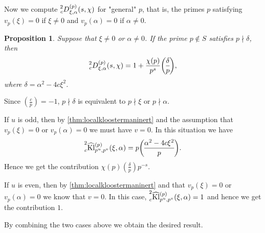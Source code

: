 \documentclass[10pt,oneside,reqno]{amsart}
\makeatletter
\newcommand\Kl{\mathrm{Kl}}
\newcommand\legendresymbol[2]{\genfrac{(}{)}{}{}{#1}{#2}}
\theoremstyle{THEOREM}
\newtheorem{proposition}[theorem]{Proposition}
\theoremstyle{DEFINITION}
\theoremstyle{EXERCISE}
\numberwithin{equation}{section}
\renewenvironment{proof}[1][\proofname]{\par
  \vspace{-6pt}
  \pushQED{\qed}
  \normalfont \topsep6\p@\@plus6\p@\relax
  \trivlist
  \item[\hskip\labelsep\rmfamily\bfseries
    #1\@addpunct{:}]\ignorespaces
}{
  \popQED\endtrivlist\@endpefalse
  \vspace{-6pt}
}
\makeatother
\begin{document}
Now we compute $\prescript{2}{c}D_{\xi,\alpha}^{(p)}(s,\chi)$ for "general" $p$, that is, the primes $p$ satisfying $v_p(\xi)=0$ if $\xi\neq 0$ and $v_p(\alpha)=0$ if $\alpha\neq 0$.

\begin{proposition}\label{prop:nonzeroinert}
Suppose that $\xi\neq 0$ or $\alpha\neq 0$. If the prime $p\notin S$ satisfies $p\nmid \delta$, then
\[
\prescript{2}{c}D_{\xi,\alpha}^{(p)}(s,\chi)=1+\frac{\chi(p)}{p^{s}}\legendresymbol{\delta}{p},
\]
where $\delta=\alpha^2-4c \xi^2$.
\end{proposition}
\begin{proof}
Since $\legendresymbol{c}{p}=-1$, $p\nmid \delta$ is equivalent to $p\nmid \xi$ or $p\nmid \alpha$.

If $u$ is odd, then by \autoref{thm:localkloostermaninert} and the assumption that $v_p(\xi)=0$ or $v_p(\alpha)=0$ we must have $v=0$. In this situation we have
\[
\prescript{2}{c}{\widehat{\Kl}}_{p^u,p^v}^{(p)}(\xi,\alpha)=p \legendresymbol{\alpha^2-4c \xi^2}{p}.
\]
Hence we get the contribution $\chi(p)\legendresymbol{\delta}{p}p^{-s}$.

If $u$ is even, then by \autoref{thm:localkloostermaninert} and that $v_p(\xi)=0$ or $v_p(\alpha)=0$ we know that $v=0$. In this case, $\prescript{2}{c}{\widehat{\Kl}}_{p^u,p^v}^{(p)}(\xi,\alpha)=1$ and hence we get the contribution $1$.

By combining the two cases above we obtain the desired result. 
\end{proof}
\end{document}
